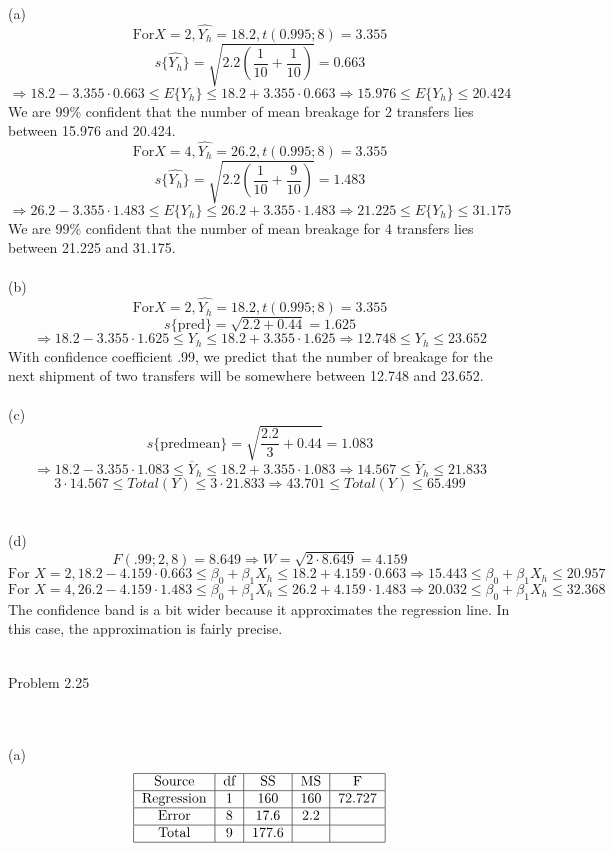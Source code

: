 \documentclass{article}
\begin{document}
\\\\(a)\[\text{For}X=2, \hat{Y_h}=18.2,t(0.995;8)=3.355\]
\[s\{\hat{Y_h}\}=\sqrt{2.2(\frac{1}{10}+\frac{1}{10})}=0.663\]
\[\Rightarrow 18.2-3.355\cdot0.663\leq E\{Y_h\}\leq18.2+3.355\cdot0.663\Rightarrow15.976\leq E\{Y_h\}\leq20.424\]
We are 99\% confident that the number of mean breakage for 2 transfers lies between 15.976 and 20.424.
\[\text{For}X=4, \hat{Y_h}=26.2,t(0.995;8)=3.355\]
\[s\{\hat{Y_h}\}=\sqrt{2.2(\frac{1}{10}+\frac{9}{10})}=1.483\]
\[\Rightarrow 26.2-3.355\cdot1.483\leq E\{Y_h\}\leq26.2+3.355\cdot1.483\Rightarrow21.225\leq E\{Y_h\}\leq31.175\]
We are 99\% confident that the number of mean breakage for 4 transfers lies between 21.225 and 31.175.
\\\\(b)\[\text{For}X=2, \hat{Y_h}=18.2,t(0.995;8)=3.355\]
\[s\{\text{pred}\}=\sqrt{2.2+0.44}=1.625\]
\[\Rightarrow 18.2-3.355\cdot1.625\leq Y_h\leq18.2+3.355\cdot1.625\Rightarrow12.748\leq Y_h\leq23.652\]
With confidence coefficient .99, we predict that the number of breakage for the next shipment of two transfers will be somewhere between 12.748 and 23.652.
\\\\(c)\[s\{\text{predmean}\}=\sqrt{\frac{2.2}{3}+0.44}=1.083\]
\[\Rightarrow 18.2-3.355\cdot1.083\leq \overline{Y}_h\leq18.2+3.355\cdot1.083\Rightarrow14.567\leq \overline{Y}_h\leq21.833\]
\[3\cdot14.567\leq Total(Y)\leq3\cdot21.833\Rightarrow43.701\leq Total(Y)\leq65.499\]
\\\\(d)\[F(.99;2,8)=8.649\Rightarrow W=\sqrt{2\cdot8.649}=4.159\]
\[\text{For }X=2, 18.2-4.159\cdot0.663\leq\beta_0+\beta_1X_h\leq18.2+4.159\cdot0.663\Rightarrow15.443\leq\beta_0+\beta_1X_h\leq	20.957\]
\[\text{For }X=4,26.2-4.159\cdot1.483\leq\beta_0+\beta_1X_h\leq26.2+4.159\cdot1.483\Rightarrow20.032\leq\beta_0+\beta_1X_h\leq	32.368\]
The confidence band is a bit wider because it approximates the regression line. In this case, the approximation is fairly precise.
\\\\\begin{large}Problem 2.25\end{large}
\\\\(a)\[\begin{tabular}{|c|c|c|c|c|}
\hline
\text{Source}&\text{df}&\text{SS}&\text{MS}&\text{F}\\
\hline
\text{Regression}&1&160&160&72.727\\
\hline
\text{Error}&8&17.6&2.2&\\
\hline
\text{Total}&9&177.6&&\\
\hline
\end{tabular}\]
\end{document}

